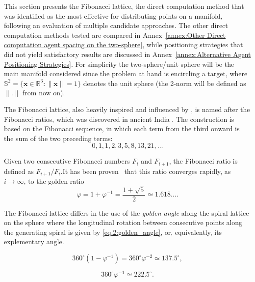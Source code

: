 This section presents the Fibonacci lattice, the direct computation method that was identified as the most effective for distributing points on a manifold, following an evaluation of multiple candidate approaches. The other direct computation methods tested are compared in Annex~\ref{annex:Other Direct computation agent spacing on the two-sphere}, while positioning strategies that did not yield satisfactory results are discussed in Annex~\ref{annex:Alternative Agent Positioning Strategies}. For simplicity the two-sphere/unit sphere will be the main manifold considered since the problem at hand is encircling a target, where $\mathbb{S}^2 = \{\mathbf{x} \in \mathbb{R}^3 : \|\mathbf{x}\| = 1\}$ denotes the unit sphere (the 2-norm will be defined as $\|.\|$ from now on). 

\label{sec.2:Fibonacci Lattice}
The Fibonacci lattice, also heavily inspired and influenced by \cite{Latitude_Longitude_vs_fibonacci}, is named after the Fibonacci ratios, which was discovered in ancient India \cite{fibonacci_history}. The construction is based on the Fibonacci sequence, in which each term from the third onward is the sum of the two preceding terms:
\[
0, 1, 1, 2, 3, 5, 8, 13, 21, \ldots
\]

Given two consecutive Fibonacci numbers $F_i$ and $F_{i+1}$, the Fibonacci ratio is defined as $F_{i+1}/F_i$.It has been proven~\cite{https://doi.org/10.1155/2013/204674} that this ratio converges rapidly, as $i \to \infty$, to the golden ratio
\begin{equation}
  \varphi = 1 + \varphi^{-1} = \frac{1 + \sqrt{5}}{2} \simeq 1.618 \ldots .
  \label{eq.2:golden_ratio}
\end{equation}

The Fibonacci lattice differs in the use of the \emph{golden angle} along the spiral lattice on the sphere where the longitudinal rotation between consecutive points along the generating spiral is given by \eqref{eq.2:golden_angle}, or, equivalently, its explementary angle.

\begin{equation}
  360^\circ \left(1 - \varphi^{-1}\right)
  = 360^\circ \varphi^{-2}
  \simeq 137.5^\circ ,
  \label{eq.2:golden_angle}
\end{equation}

\begin{equation*}
  360^\circ \varphi^{-1} \simeq 222.5^\circ .
  \label{eq.2:golden_angle_complementary}
\end{equation*}

